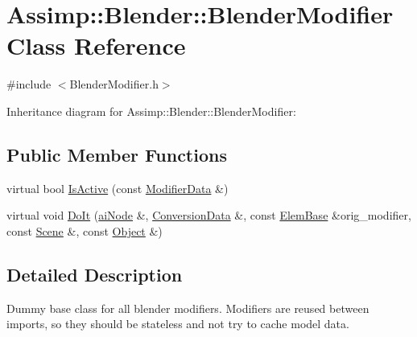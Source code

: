 \hypertarget{class_assimp_1_1_blender_1_1_blender_modifier}{\section{Assimp\+:\+:Blender\+:\+:Blender\+Modifier Class Reference}
\label{class_assimp_1_1_blender_1_1_blender_modifier}
}


{\ttfamily \#include $<$Blender\+Modifier.\+h$>$}



Inheritance diagram for Assimp\+:\+:Blender\+:\+:Blender\+Modifier\+:
\subsection*{Public Member Functions}
\begin{DoxyCompactItemize}
\item 
virtual bool \hyperlink{class_assimp_1_1_blender_1_1_blender_modifier_a51461ec72bbc9ff9d839d04bf520042b}{Is\+Active} (const \hyperlink{struct_assimp_1_1_blender_1_1_modifier_data}{Modifier\+Data} \&)
\item 
virtual void \hyperlink{class_assimp_1_1_blender_1_1_blender_modifier_a3776e392c50da71b52484c48ae4b4cb9}{Do\+It} (\hyperlink{structai_node}{ai\+Node} \&, \hyperlink{struct_assimp_1_1_blender_1_1_conversion_data}{Conversion\+Data} \&, const \hyperlink{struct_assimp_1_1_blender_1_1_elem_base}{Elem\+Base} \&orig\+\_\+modifier, const \hyperlink{struct_assimp_1_1_blender_1_1_scene}{Scene} \&, const \hyperlink{struct_assimp_1_1_blender_1_1_object}{Object} \&)
\end{DoxyCompactItemize}


\subsection{Detailed Description}
Dummy base class for all blender modifiers. Modifiers are reused between imports, so they should be stateless and not try to cache model data. 

